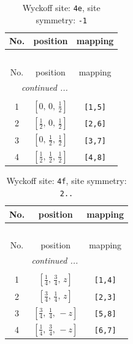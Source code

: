 \documentclass[fleqn,8pt]{jsarticle}
\begin{document}
\begin{longtable}{ccc}
\caption{Wyckoff site: {\tt 4e}, site symmetry: {\tt -1}}
 \\
 \hline \hline
No. & position & mapping \\ \hline \endfirsthead

\multicolumn{2}{l}{\tablename\ \thetable{}} \\
 \hline \hline
No. & position & mapping \\ \hline \endhead

 \hline \hline
\multicolumn{2}{r}{\footnotesize\it continued ...} \\ \endfoot

 \hline \hline
\multicolumn{2}{r}{} \\ \endlastfoot

1 & $\left[ 0,\, 0,\, \frac{1}{2} \right]$ & {\tt [1,5]} \\ \hline
2 & $\left[ \frac{1}{2},\, 0,\, \frac{1}{2} \right]$ & {\tt [2,6]} \\ \hline
3 & $\left[ 0,\, \frac{1}{2},\, \frac{1}{2} \right]$ & {\tt [3,7]} \\ \hline
4 & $\left[ \frac{1}{2},\, \frac{1}{2},\, \frac{1}{2} \right]$ & {\tt [4,8]} \\
\end{longtable}
\renewcommand{\arraystretch}{1.2}
\begin{longtable}{ccc}
\caption{Wyckoff site: {\tt 4f}, site symmetry: {\tt 2..}}
 \\
 \hline \hline
No. & position & mapping \\ \hline \endfirsthead

\multicolumn{2}{l}{\tablename\ \thetable{}} \\
 \hline \hline
No. & position & mapping \\ \hline \endhead

 \hline \hline
\multicolumn{2}{r}{\footnotesize\it continued ...} \\ \endfoot

 \hline \hline
\multicolumn{2}{r}{} \\ \endlastfoot

1 & $\left[ \frac{1}{4},\, \frac{3}{4},\, z \right]$ & {\tt [1,4]} \\ \hline
2 & $\left[ \frac{3}{4},\, \frac{1}{4},\, z \right]$ & {\tt [2,3]} \\ \hline
3 & $\left[ \frac{3}{4},\, \frac{1}{4},\, - z \right]$ & {\tt [5,8]} \\ \hline
4 & $\left[ \frac{1}{4},\, \frac{3}{4},\, - z \right]$ & {\tt [6,7]} \\
\end{longtable}
\end{document}
